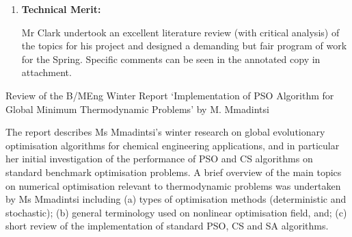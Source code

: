 \documentclass[14pt,twoside]{report}
\begin{document}
\begin{enumerate}
\begin{enumerate}
                   The literature review undertaken in this report was very thorough {\it wrt} thermodynamic cycles and energy aspects of smart cities, but limited on the energy integration part;
                   \item The work plan is appropriate for the project and seems realistic;
                \end{enumerate}
%
    \item {\bf Technical Merit:}

                    Mr Clark undertook an excellent literature review (with critical analysis) of the topics for his project and designed a demanding but fair program of work for the Spring.  Specific comments can be seen in the annotated copy in attachment.
%
\end{enumerate}

\clearpage



\bigskip

\begin{center}
  {\Large Review of the B/MEng Winter Report `Implementation of PSO Algorithm for Global Minimum Thermodynamic Problems' by M. Mmadintsi}
\end{center}

The report describes Ms Mmadintsi's winter research on global evolutionary optimisation algorithms for chemical engineering applications, and in particular her initial investigation of the performance of PSO and CS algorithms on standard benchmark optimisation problems. A brief overview of the main topics on numerical optimisation relevant to thermodynamic problems was undertaken by Ms Mmadintsi including (a) types of optimisation methods (deterministic and stochastic); (b) general terminology used on nonlinear optimisation field, and; (c) short review of the implementation of standard PSO, CS and SA algorithms.   
\end{document}
